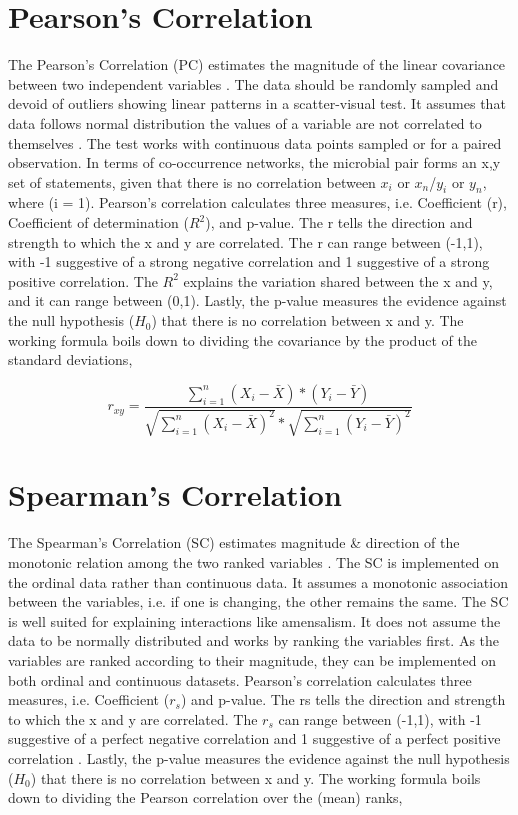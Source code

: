 \section{Pearson's Correlation}
The Pearson's Correlation (PC) estimates the magnitude of the linear covariance between two independent variables \cite{schober_2018_correlation}. The data should be randomly sampled and devoid of outliers showing linear patterns in a scatter-visual test. It assumes that data follows normal distribution the values of a variable are not correlated to themselves \cite{schober_2018_correlation}. The test works with continuous data points sampled or for a paired observation. In terms of co-occurrence networks, the microbial pair forms an {x,y} set of statements, given that there is no correlation between $x_{i}$ or $x_{n}$/$y_{i}$ or $y_{n}$, where (i = 1). Pearson's correlation calculates three measures, i.e. Coefficient (r), Coefficient of determination ($R^{2}$), and p-value. The r tells the direction and strength to which the x and y are correlated. The r can range between (-1,1), with -1 suggestive of a strong negative correlation and 1 suggestive of a strong positive correlation. The $R^{2}$ explains the variation shared between the x and y, and it can range between (0,1). Lastly, the p-value measures the evidence against the null hypothesis ($H_{0}$) that there is no correlation between x and y. The working formula boils down to dividing the covariance by the product of the standard deviations,

$$r_{xy} = \frac{\sum_{i=1}^{n} (X_{i} - \bar{X}) * (Y_{i} - \bar{Y})}{\sqrt{\sum_{i=1}^{n} (X_{i} - \bar{X})^{2}} * \sqrt{\sum_{i=1}^{n} (Y_{i} - \bar{Y})^{2}}}$$

\section{Spearman's Correlation}
The Spearman's Correlation (SC) estimates magnitude \& direction of the monotonic relation among the two ranked variables \cite{dewinter_2016_comparing}. The SC is implemented on the ordinal data rather than continuous data. It assumes a monotonic association between the variables, i.e. if one is changing, the other remains the same. The SC is well suited for explaining interactions like amensalism. It does not assume the data to be normally distributed and works by ranking the variables first. As the variables are ranked according to their magnitude, they can be implemented on both ordinal and continuous datasets. Pearson's correlation calculates three measures, i.e. Coefficient ($r_{s}$) and p-value. The rs tells the direction and strength to which the x and y are correlated. The $r_{s}$ can range between (-1,1), with -1 suggestive of a perfect negative correlation and 1 suggestive of a perfect positive correlation \cite{dewinter_2016_comparing}. Lastly, the p-value measures the evidence against the null hypothesis ($H_{0}$) that there is no correlation between x and y. The working formula boils down to dividing the Pearson correlation over the (mean) ranks,

